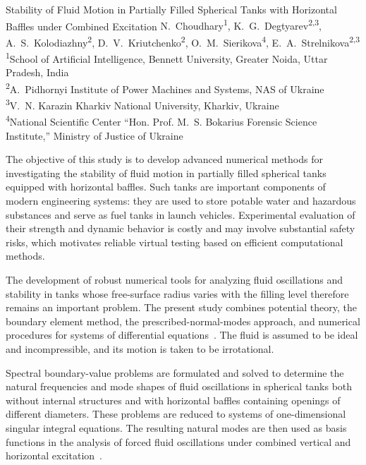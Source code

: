 \ReportHeading
  {Stability of Fluid Motion in Partially Filled Spherical Tanks with Horizontal Baffles under Combined Excitation}
  {N.~Choudhary\textsuperscript{1}, K.~G.~Degtyarev\textsuperscript{2,3}, A.~S.~Kolodiazhny\textsuperscript{2}, D.~V.~Kriutchenko\textsuperscript{2}, O.~M.~Sierikova\textsuperscript{4}, E.~A.~Strelnikova\textsuperscript{2,3}}
  {\textsuperscript{1}School of Artificial Intelligence, Bennett University, Greater Noida, Uttar Pradesh, India\\
   \textsuperscript{2}A.~Pidhornyi Institute of Power Machines and Systems, NAS of Ukraine\\
   \textsuperscript{3}V.~N. Karazin Kharkiv National University, Kharkiv, Ukraine\\
   \textsuperscript{4}National Scientific Center ``Hon. Prof. M.~S. Bokarius Forensic Science Institute,'' Ministry of Justice of Ukraine}
  {}

The objective of this study is to develop advanced numerical methods for investigating the stability of fluid motion in partially filled spherical tanks equipped with horizontal baffles. Such tanks are important components of modern engineering systems: they are used to store potable water and hazardous substances and serve as fuel tanks in launch vehicles. Experimental evaluation of their strength and dynamic behavior is costly and may involve substantial safety risks, which motivates reliable virtual testing based on efficient computational methods.

The development of robust numerical tools for analyzing fluid oscillations and stability in tanks whose free-surface radius varies with the filling level therefore remains an important problem. The present study combines potential theory, the boundary element method, the prescribed-normal-modes approach, and numerical procedures for systems of differential equations~\cite{tank:gnitko2022}. The fluid is assumed to be ideal and incompressible, and its motion is taken to be irrotational.

Spectral boundary-value problems are formulated and solved to determine the natural frequencies and mode shapes of fluid oscillations in spherical tanks both without internal structures and with horizontal baffles containing openings of different diameters. These problems are reduced to systems of one-dimensional singular integral equations. The resulting natural modes are then used as basis functions in the analysis of forced fluid oscillations under combined vertical and horizontal excitation~\cite{tank:sierikova2022}.

